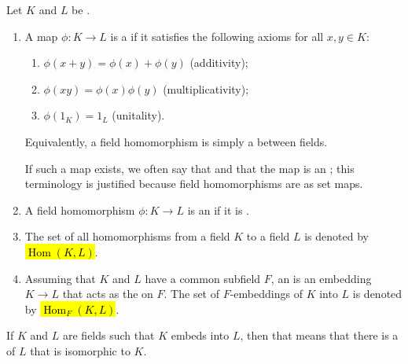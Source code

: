 \begin{definition} \label{definition:field_homomorphism}
Let $K$ and $L$ be .
\begin{enumerate}
    \item A map $\phi: K \to L$ is a  if it satisfies the following axioms for all $x, y \in K$:
    \begin{enumerate}
        \item $\phi(x + y) = \phi(x) + \phi(y)$ (additivity);
        \item $\phi(xy) = \phi(x)\phi(y)$ (multiplicativity);
        \item $\phi(1_K) = 1_L$ (unitality).
    \end{enumerate}
    Equivalently, a field homomorphism is simply a  between fields.

    If such a map exists, we often say that  and that the map is an ; this terminology is justified because field homomorphisms are  as set maps. 

    \item A field homomorphism $\phi: K \to L$ is an  if it is . 

    \item The set of all homomorphisms from a field $K$ to a field $L$ is denoted by \hl{$\operatorname{Hom}(K, L)$}. 
    
    \item Assuming that $K$ and $L$ have a common subfield $F$, an  is an embedding $K \to L$ that acts as the  on $F$. The set of $F$-embeddings of $K$ into $L$ is denoted by \hl{$\operatorname{Hom}_F(K, L)$}.
\end{enumerate}

If $K$ and $L$ are fields such that $K$ embeds into $L$, then that means that there is a  of $L$ that is isomorphic to $K$.

\end{definition}